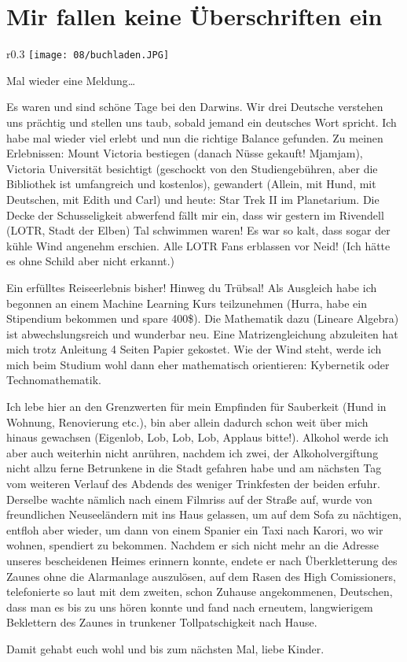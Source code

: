 \chapter{Mir fallen keine \"Uberschriften ein}

\begin{wrapfigure}{r}{0.3\textwidth}
  \centering
  \texttt{[image: 08/buchladen.JPG]}
\end{wrapfigure}
Mal wieder eine Meldung\ldots{}

Es waren und sind schöne Tage bei den Darwins. Wir drei Deutsche
verstehen uns prächtig und stellen uns taub, sobald jemand ein
deutsches Wort spricht. Ich habe mal wieder viel erlebt und nun die
richtige Balance gefunden. Zu meinen Erlebnissen: Mount Victoria
bestiegen (danach Nüsse gekauft! Mjamjam), Victoria Universität
besichtigt (geschockt von den Studiengebühren, aber die Bibliothek ist
umfangreich und kostenlos), gewandert (Allein, mit Hund, mit
Deutschen, mit Edith und Carl) und heute: Star Trek II im
Planetarium. Die Decke der Schusseligkeit abwerfend fällt mir ein,
dass wir gestern im Rivendell (LOTR, Stadt der Elben) Tal schwimmen
waren! Es war so kalt, dass sogar der kühle Wind angenehm
erschien. Alle LOTR Fans erblassen vor Neid!  (Ich hätte es ohne
Schild aber nicht erkannt.)

Ein erfülltes Reiseerlebnis bisher! Hinweg du Trübsal! Als Ausgleich
habe ich begonnen an einem Machine Learning Kurs teilzunehmen (Hurra,
habe ein Stipendium bekommen und spare 400\$). Die Mathematik dazu
(Lineare Algebra) ist abwechslungsreich und wunderbar neu. Eine
Matrizengleichung abzuleiten hat mich trotz Anleitung 4 Seiten Papier
gekostet. Wie der Wind steht, werde ich mich beim Studium wohl dann eher
mathematisch orientieren: Kybernetik oder Technomathematik.

Ich lebe hier an den Grenzwerten für mein Empfinden für Sauberkeit (Hund
in Wohnung, Renovierung etc.), bin aber allein dadurch schon weit über
mich hinaus gewachsen (Eigenlob, Lob, Lob, Lob, Applaus bitte!). Alkohol
werde ich aber auch weiterhin nicht anrühren, nachdem ich zwei, der
Alkoholvergiftung nicht allzu ferne Betrunkene in die Stadt gefahren
habe und am nächsten Tag vom weiteren Verlauf des Abdends des weniger
Trinkfesten der beiden erfuhr. Derselbe wachte nämlich nach einem
Filmriss auf der Straße auf, wurde von freundlichen Neuseeländern mit
ins Haus gelassen, um auf dem Sofa zu nächtigen, entfloh aber wieder, um
dann von einem Spanier ein Taxi nach Karori, wo wir wohnen, spendiert zu
bekommen. Nachdem er sich nicht mehr an die Adresse unseres bescheidenen
Heimes erinnern konnte, endete er nach Überkletterung des Zaunes ohne
die Alarmanlage auszulösen, auf dem Rasen des High Comissioners,
telefonierte so laut mit dem zweiten, schon Zuhause angekommenen,
Deutschen, dass man es bis zu uns hören konnte und fand nach erneutem,
langwierigem Beklettern des Zaunes in trunkener Tollpatschigkeit nach
Hause.

Damit gehabt euch wohl und bis zum nächsten Mal, liebe Kinder.
